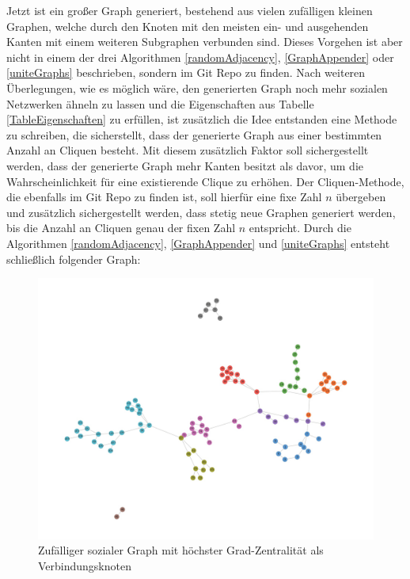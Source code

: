 \newpage
Jetzt ist ein großer Graph generiert, bestehend aus vielen zufälligen kleinen Graphen, welche durch den Knoten mit den meisten ein- und ausgehenden Kanten mit einem weiteren Subgraphen verbunden sind. Dieses Vorgehen ist aber nicht in einem der drei Algorithmen \ref{randomAdjacency}, \ref{GraphAppender} oder \ref{uniteGraphs} beschrieben, sondern im Git Repo \cite{TZ} zu finden. 
Nach weiteren Überlegungen, wie es möglich wäre, den generierten Graph noch mehr sozialen Netzwerken ähneln zu lassen und die Eigenschaften aus Tabelle \ref{TableEigenschaften} zu erfüllen, ist zusätzlich die Idee entstanden eine Methode zu schreiben, die sicherstellt, dass der generierte Graph aus einer bestimmten Anzahl an Cliquen besteht. Mit diesem zusätzlich Faktor soll sichergestellt werden, dass der generierte Graph mehr Kanten besitzt als davor, um die Wahrscheinlichkeit für eine existierende Clique zu erhöhen. Der Cliquen-Methode, die ebenfalls im Git Repo \cite{TZ} zu finden ist, soll hierfür eine fixe Zahl $n$ übergeben und zusätzlich sichergestellt werden, dass stetig neue Graphen generiert werden, bis die Anzahl an Cliquen genau der fixen Zahl $n$ entspricht.
Durch die Algorithmen \ref{randomAdjacency}, \ref{GraphAppender} und \ref{uniteGraphs} entsteht schließlich folgender Graph:

\FloatBarrier
\begin{figure}[h!]
    \centering
    \hspace*{-1.5cm}
    \includegraphics[width=1.0\textwidth]{Graphics/NearSocialNetwork.jpg}
    \caption{Zufälliger sozialer Graph mit höchster Grad-Zentralität als Verbindungsknoten }
    \label{NearSozialerGraph}
\end{figure}

